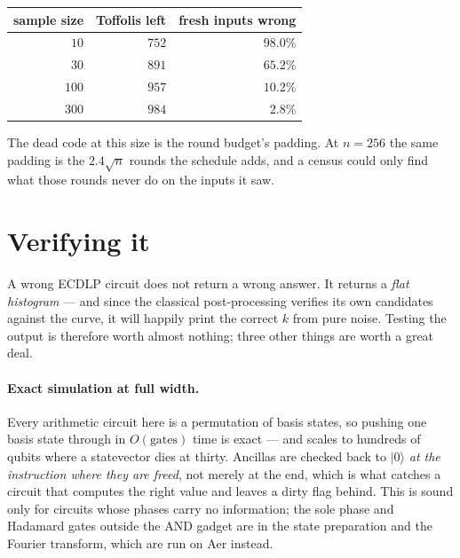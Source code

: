 \documentclass[11pt]{article}
\renewcommand{\ket}[1]{\lvert #1 \rangle}
\theoremstyle{plain}
\theoremstyle{remark}
\begin{document}
\begin{center}\small
\begin{tabular}{rrr}
\toprule
sample size & Toffolis left & fresh inputs wrong\\
\midrule
$10$ & $752$ & $98.0\%$\\
$30$ & $891$ & $65.2\%$\\
$100$ & $957$ & $10.2\%$\\
$300$ & $984$ & $2.8\%$\\
\bottomrule
\end{tabular}
\end{center}

\noindent The dead code at this size is the round budget's padding. At $n=256$ the same padding is
the $2.4\sqrt n$ rounds the schedule adds, and a census could only find what those rounds never do
on the inputs it saw.

\section{Verifying it}\label{ec:sec:verify}

A wrong ECDLP circuit does not return a wrong answer. It returns a \emph{flat histogram} --- and
since the classical post-processing verifies its own candidates against the curve, it will happily
print the correct $k$ from pure noise. Testing the output is therefore worth almost nothing; three
other things are worth a great deal.

\paragraph{Exact simulation at full width.}
Every arithmetic circuit here is a permutation of basis states, so pushing one basis state through
in $O(\text{gates})$ time is exact --- and scales to hundreds of qubits where a statevector dies at
thirty. Ancillas are checked back to $\ket0$ \emph{at the instruction where they are freed}, not
merely at the end, which is what catches a circuit that computes the right value and leaves a dirty
flag behind. This is sound only for circuits whose phases carry no information; the sole phase and
Hadamard gates outside the AND gadget are in the state preparation and the Fourier transform, which
are run on Aer instead.
\end{document}
